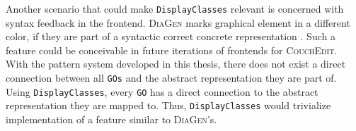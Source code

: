 

Another scenario that could make \texttt{DisplayClasses} relevant is concerned with syntax feedback in the frontend. \textsc{DiaGen} marks graphical element in a different color, if they are part of a syntactic correct concrete representation . Such a feature could be conceivable in future iterations of frontends for \textsc{CouchEdit}. With the pattern system developed in this thesis, there does not exist a direct connection between all \texttt{GOs} and the abstract representation they are part of. Using \texttt{DisplayClasses}, every \texttt{GO} has a direct connection to the abstract representation they are mapped to. Thus, \texttt{DisplayClasses} would trivialize implementation of a feature similar to \textsc{DiaGen}'s.



\section{}



